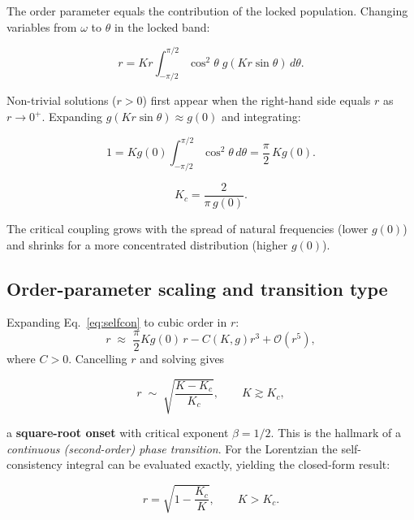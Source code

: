 \documentclass[12pt,a4paper]{article}
\begin{document}
The order parameter equals the contribution of the locked population.
Changing variables from $\omega$ to $\theta$ in the locked band:

\begin{equation}
  r = Kr\int_{-\pi/2}^{\pi/2}
  \cos^2\!\theta\; g(Kr\sin\theta)\,d\theta.
  \label{eq:selfcon}
\end{equation}

Non-trivial solutions ($r > 0$) first appear when the right-hand side
equals $r$ as $r \to 0^+$.
Expanding $g(Kr\sin\theta) \approx g(0)$ and integrating:

\[
  1 = Kg(0)\int_{-\pi/2}^{\pi/2}\cos^2\!\theta\,d\theta
    = \frac{\pi}{2}\,Kg(0).
\]

\begin{mdframed}[style=keybox]
\begin{equation}
  K_c = \frac{2}{\pi\,g(0)}.
  \label{eq:kc}
\end{equation}
\end{mdframed}

The critical coupling grows with the spread of natural frequencies
(lower $g(0)$) and shrinks for a more concentrated distribution
(higher $g(0)$).

\subsection{Order-parameter scaling and transition type}

Expanding Eq.~\eqref{eq:selfcon} to cubic order in $r$:
\begin{equation}
  r \;\approx\; \frac{\pi}{2}Kg(0)\,r - C(K,g)r^3 + \mathcal{O}(r^5),
\end{equation}
where $C > 0$.
Cancelling $r$ and solving gives

\begin{equation}
  r \;\sim\; \sqrt{\frac{K - K_c}{K_c}},\qquad K \gtrsim K_c,
  \label{eq:scaling}
\end{equation}

a \textbf{square-root onset} with critical exponent $\beta = 1/2$.
This is the hallmark of a \emph{continuous (second-order) phase transition}.
For the Lorentzian the self-consistency integral can be evaluated exactly,
yielding the closed-form result:

\begin{equation}
  r = \sqrt{1 - \frac{K_c}{K}},\qquad K > K_c.
  \label{eq:exact_lor}
\end{equation}
\end{document}
